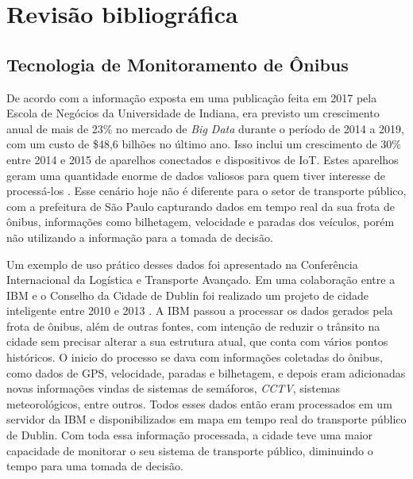 \chapter{Revisão bibliográfica}
\label{Cap:RevisaoBibliografica}
\newcommand{\WidthAlgumaCoisa}{6.5 cm}



\section{Tecnologia de Monitoramento de Ônibus}

\indent
\par De acordo com a informação exposta em uma publicação feita em 2017 pela Escola de Negócios da Universidade de Indiana, era previsto um crescimento anual de mais de 23\% no mercado de \textit{Big Data} durante o período de 2014 a 2019, com um custo de \$48,6 bilhões no último ano. Isso inclui um crescimento de 30\% entre 2014 e 2015 de aparelhos conectados e dispositivos de IoT. Estes aparelhos geram uma quantidade enorme de dados valiosos para quem tiver interesse de processá-los \cite{Lee2017}. Esse cenário hoje não é diferente para o setor de transporte público, com a prefeitura de São Paulo capturando dados em tempo real da sua frota de ônibus, informações como bilhetagem, velocidade e paradas dos veículos, porém não utilizando a informação para a tomada de decisão.

\par Um exemplo de uso prático desses dados foi apresentado na Conferência Internacional da Logística e Transporte Avançado. Em uma colaboração entre a IBM e o Conselho da Cidade de Dublin foi realizado um projeto de cidade inteligente entre 2010 e 2013 \cite{BenAyed2015}. A IBM passou a processar os dados gerados pela frota de ônibus, além de outras fontes, com intenção de reduzir o trânsito na cidade sem precisar alterar a sua estrutura atual, que conta com vários pontos históricos. O inicio do processo se dava com informações coletadas do ônibus, como dados de GPS, velocidade, paradas e bilhetagem, e depois eram adicionadas novas informações vindas de sistemas de semáforos, \textit{CCTV}, sistemas meteorológicos, entre outros. Todos esses dados então eram processados em um servidor da IBM e disponibilizados em mapa em tempo real do transporte público de Dublin. Com toda essa informação processada, a cidade teve uma maior capacidade de monitorar o seu sistema de transporte público, diminuindo o tempo para uma tomada de decisão.

